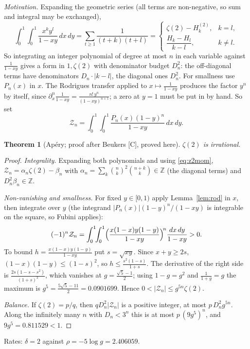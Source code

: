 \documentclass[11pt,a4paper]{article}
\makeatletter
\newcommand{\Z}{\mathbb Z}
\newcommand{\dd}{\,d}
\newcommand{\st}[1]{\textsf{[#1]}}
\newtheorem{theorem}{Theorem}
\theoremstyle{definition}
\renewcommand\subsection{\@startsection{subsection}{2}{\z@}{-1.6ex plus -.5ex minus -.2ex}{.7ex plus .2ex}{\normalfont\normalsize\bfseries}}
\makeatother
\begin{document}
\subsection{\texorpdfstring{$\zeta(2)$}{zeta(2)}}
\emph{Motivation.} Expanding the geometric series (all terms are non-negative, so sum and integral
may be exchanged),
\begin{equation}\label{eq:z2mom}
\int_0^1\!\!\int_0^1\frac{x^ky^l}{1-xy}\dd x\dd y=\sum_{t\ge1}\frac1{(t+k)(t+l)}=
\begin{cases}\zeta(2)-H_k^{(2)},&k=l,\\[2pt] \dfrac{H_k-H_l}{k-l},&k\ne l.\end{cases}
\end{equation}
So integrating an integer polynomial of degree at most $n$ in each variable against $\frac1{1-xy}$
gives a form in $1,\zeta(2)$ with denominator budget $D_n^2$: the off-diagonal terms have
denominators $D_n\cdot|k-l|$, the diagonal ones $D_n^2$. For smallness use $P_n(x)$ in $x$. The
Rodrigues transfer applied to $x\mapsto\frac1{1-xy}$ produces the factor $y^n$ by itself, since
$\partial_x^n\frac1{1-xy}=\frac{n!\,y^n}{(1-xy)^{n+1}}$; a zero at $y=1$ must be put in by hand. So set
\[
\mathcal Z_n=\int_0^1\!\!\int_0^1\frac{P_n(x)(1-y)^n}{1-xy}\dd x\dd y .
\]
\begin{theorem}[Ap\'ery; proof after Beukers \st{C}, proved here]\label{thm:z2}
$\zeta(2)$ is irrational.
\end{theorem}
\begin{proof}
\emph{Integrality.} Expanding both polynomials and using \eqref{eq:z2mom},
$\mathcal Z_n=\alpha_n\zeta(2)-\beta_n$ with $\alpha_n=\sum_k\binom nk^2\binom{n+k}k\in\Z$ (the diagonal
terms) and $D_n^2\beta_n\in\Z$.

\emph{Non-vanishing and smallness.} For fixed $y\in[0,1)$ apply Lemma~\ref{lem:rod} in $x$, then
integrate over $y$ (the integrand $|P_n(x)|(1-y)^n/(1-xy)$ is integrable on the square, so Fubini
applies):
\[
(-1)^n\mathcal Z_n=\int_0^1\!\!\int_0^1\Bigl(\frac{x(1-x)y(1-y)}{1-xy}\Bigr)^{\!n}\frac{dx\dd y}{1-xy}>0 .
\]
To bound $h=\frac{x(1-x)y(1-y)}{1-xy}$ put $s=\sqrt{xy}$. Since $x+y\ge2s$,
$(1-x)(1-y)\le(1-s)^2$, so $h\le\frac{s^2(1-s)}{1+s}$. The derivative of the right side is
$\frac{2s(1-s-s^2)}{(1+s)^2}$, which vanishes at $g=\frac{\sqrt5-1}2$; using $1-g=g^2$ and
$\frac1{1+g}=g$ the maximum is $g^5=\frac{5\sqrt5-11}2=0.0901699$. Hence
$0<|\mathcal Z_n|\le g^{5n}\zeta(2)$.

\emph{Balance.} If $\zeta(2)=p/q$, then $qD_n^2|\mathcal Z_n|$ is a positive integer, at most $p\,D_n^2g^{5n}$.
Along the infinitely many $n$ with $D_n<3^n$ this is at most $p\,(9g^5)^n$, and
$9g^5=0.811529<1$.
\end{proof}
Rates: $\delta=2$ against $\rho=-5\log g=2.406059$.
\end{document}
